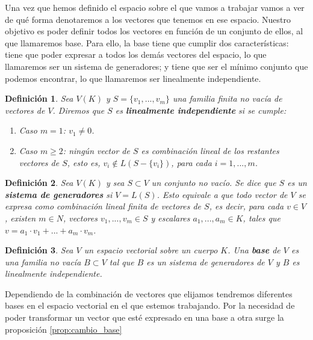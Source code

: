 \documentclass[a4paper,11pt, oneside]{book}
\newtheorem{defi}{Definición}
\begin{document}
Una vez que hemos definido el espacio sobre el que vamos a trabajar vamos a ver de qué forma denotaremos a los vectores que tenemos en ese espacio. Nuestro objetivo es poder definir todos los vectores en función de un conjunto de ellos, al que llamaremos base. Para ello, la base tiene que cumplir dos características: tiene que poder expresar a todos los demás vectores del espacio, lo que llamaremos ser un sistema de generadores; y tiene que ser el mínimo conjunto que podemos encontrar, lo que llamaremos ser linealmente independiente.


\begin{defi}
	Sea $V(K)$ y $S = \{v_1,...,v_m\}$ una familia finita no vacía de vectores de $V$. Diremos que $S$ es \textbf{linealmente independiente} si se cumple:
	\begin{enumerate}
		\item Caso $m=1$: $v_1 \neq 0$.
		\item Caso $m \geq 2$: ningún vector de $S$ es combinación lineal de los restantes vectores de $S$, esto es, $v_i \notin L(S -\{v_i\})$, para cada $i=1,...,m$.
	\end{enumerate}
\end{defi}
\begin{defi}
	Sea $V(K)$ y sea $S \subset V$ un conjunto no vacío. Se dice que $S$ es un \textbf{sistema de generadores} si $V = L(S)$. Esto equivale a que todo vector de $V$ se expresa como combinación lineal finita de vectores de $S$, es decir, para cada $v \in V$, existen $m \in N$, vectores $v_1,...,v_m \in S$ y escalares $a_1,...,a_m \in K$, tales que $v = a_1\cdot v_1+...+a_m\cdot v_m$.
\end{defi}
\begin{defi}
	Sea $V$ un espacio vectorial sobre un cuerpo $K$. Una \textbf{base} de $V$ es una familia no vacía $B \subset V$ tal que $B$ es un sistema de generadores de $V$ y $B$ es linealmente independiente.
\end{defi}

Dependiendo de la combinación de vectores que elijamos tendremos diferentes bases en el espacio vectorial en el que estemos trabajando. Por la necesidad de poder transformar un vector que esté expresado en una base a otra surge la proposición \ref{prop:cambio_base}
\end{document}
